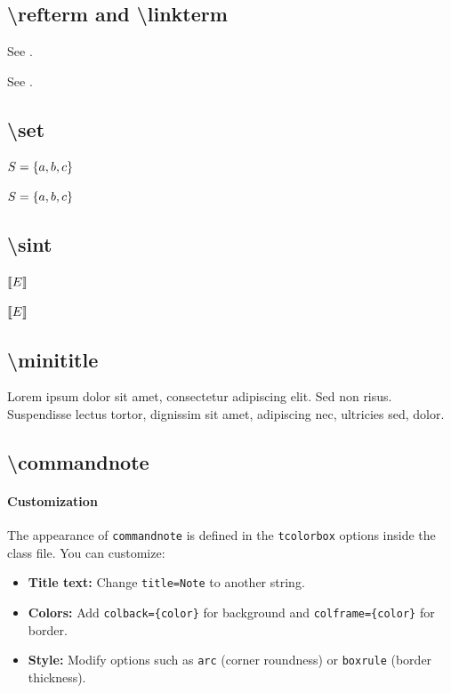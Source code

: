 \documentclass{lecturenotes}
\begin{document}
\subsection{\textbackslash refterm and \textbackslash linkterm}
\begin{codeblock}
See .
\end{codeblock}

 See .

\subsection{\textbackslash set}
\begin{codeblock}
$S = \{a, b, c\}$
\end{codeblock}

$S = \{a, b, c\}$

\subsection{\textbackslash sint}
\begin{codeblock}
$\llbracket E \rrbracket$
\end{codeblock}

$\llbracket E \rrbracket$


\subsection{\textbackslash minititle}
\begin{codeblock}
\end{codeblock}

Lorem ipsum dolor sit amet, consectetur adipiscing elit. Sed non risus. 
Suspendisse lectus tortor, dignissim sit amet, adipiscing nec, ultricies sed, dolor.

\newpage
\subsection{\textbackslash commandnote}\label{sec:commandnote}
\begin{codeblock}
\end{codeblock}


\paragraph{Customization}
The appearance of \texttt{commandnote} is defined in the \texttt{tcolorbox} options inside the class file.
You can customize:
\begin{itemize}
    \item \textbf{Title text:} Change \texttt{title=Note} to another string.
    \item \textbf{Colors:} Add \texttt{colback=\{color\}} for background and \texttt{colframe=\{color\}} for border.
    \item \textbf{Style:} Modify options such as \texttt{arc} (corner roundness) or \texttt{boxrule} (border thickness).
\end{itemize}
\end{document}
